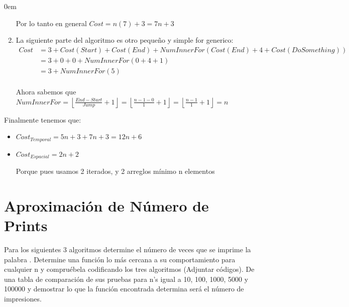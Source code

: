\documentclass[12pt, fleqn]{article}                            %
\newenvironment{SmallIndentation}[1][0.75em]                    %
        {\begin{adjustwidth}{#1}{}\begin{footnotesize}}             %
        {\end{footnotesize}\end{adjustwidth}}                       %
\newcommand \Quote {\qq}                                        %
\theoremstyle{break}                                            %
\newcommand{\Floor}[1]{\left \lfloor #1 \right \rfloor}         %
\begin{document}
\begin{SmallIndentation}[0em]
\begin{enumerate}
                Por lo tanto en general $Cost = n(7)+3 = 7n + 3$

            \item
                La siguiente parte del algoritmo es otro pequeño y simple for generico:
                \begin{align*}
                    Cost 
                        &= 3 + Cost(Start) + Cost(End) + NumInnerFor(Cost(End) + 4 + Cost(DoSomething))     \\
                        &= 3 + 0 + 0 + NumInnerFor(0 + 4 + 1)     \\
                        &= 3 + NumInnerFor(5)     \\
                \end{align*}

                Ahora sabemos que 
                $NumInnerFor 
                    = \Floor{\frac{End - Start}{Jump} + 1}
                    = \Floor{\frac{n - 1- 0}{1} + 1}
                    = \Floor{\frac{n-1}{1} + 1}
                    = n$

        \end{enumerate}

        Finalmente tenemos que:
        \begin{itemize}
            \item $Cost_{Temporal} = 5n + 3 + 7n + 3 = 12n + 6$
            \item $Cost_{Espacial} = 2n + 2$

                Porque pues usamos 2 iterados, y 2 arreglos mínimo n elementos
        \end{itemize}
            
    \end{SmallIndentation}








\clearpage
\section{Aproximación de Número de Prints}


    Para los siguientes 3 algoritmos determine el número de veces que se
    imprime la palabra \Quote{Algoritmos}. Determine una función lo más
    cercana a su comportamiento para cualquier n y compruébela
    codificando los tres algoritmos (Adjuntar códigos). De una tabla de
    comparación de sus pruebas para n’s igual a 10, 100, 1000, 5000 y
    100000 y demostrar lo que la función encontrada determina será el
    número de impresiones.
\end{document}
